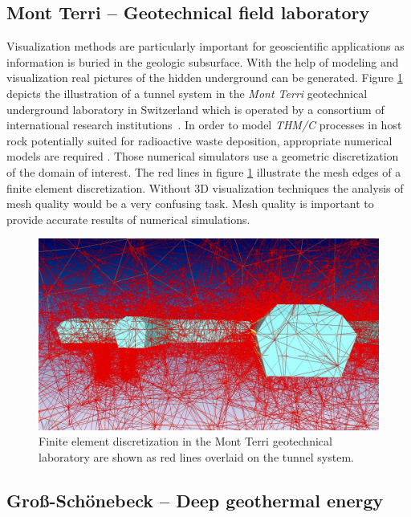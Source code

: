 \documentclass[twocolumn]{svjour3}          %
\begin{document}
\subsection{Mont Terri -- Geotechnical field laboratory}
\label{Mont Terri -- Geotechnical Field Laboratory}

Visualization methods are particularly important for geoscientific applications as information is buried in the geologic subsurface. With the help of modeling and visualization real pictures of the hidden underground can be generated. Figure \ref{fig:mont-terri} depicts the illustration of a tunnel system in the \emph{Mont Terri} geotechnical underground laboratory in Switzerland which is operated by a consortium of international research institutions~\cite{web:mont-terri}. In order to model \emph{THM/C} processes in host rock potentially suited for radioactive waste deposition, appropriate numerical models are required \cite{ Kolditz2004345, Shao20091287, Xie2006122}. Those numerical simulators use a geometric discretization of the domain of interest. The red lines in figure \ref{fig:mont-terri} illustrate the mesh edges of a finite element discretization. Without 3D visualization techniques the analysis of mesh quality would be a very confusing task. Mesh quality is important to provide accurate results of numerical simulations.

\begin{figure}[htb]
  \includegraphics[width=\linewidth]{images/mont-terri.jpg}
\caption{Finite element discretization in the Mont Terri geo\-tech\-nical laboratory are shown as red lines overlaid on the tunnel system.}
\label{fig:mont-terri}
\end{figure}

\subsection{Gro{\ss}-Sch\"onebeck -- Deep geothermal energy}
\label{grouss-schoenebeck---geothermal-energy}
\end{document}
